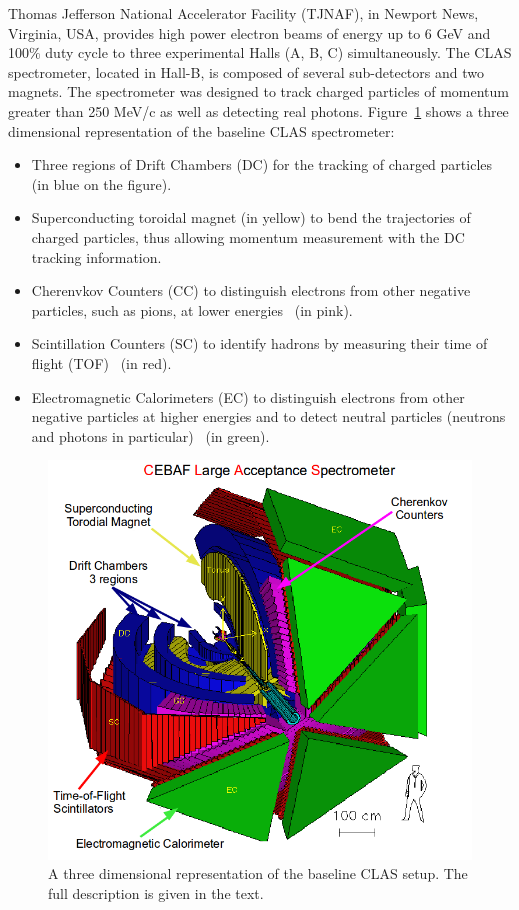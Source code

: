 \documentclass[twocolumn,showpacs,superscriptaddress,groupedaddress]{revtex4}
\begin{document}
Thomas Jefferson National Accelerator Facility (TJNAF), in Newport News, Virginia,
USA, provides high power electron beams of energy up to 6 GeV and 100$\%$ duty cycle
to three experimental Halls (A, B, C) simultaneously. The CLAS spectrometer, located
in Hall-B, is composed of several sub-detectors and two magnets. The spectrometer
was designed to track charged particles of momentum greater than 250 MeV/c as well 
as detecting real photons. Figure~\ref{fig:CLAS} shows a three dimensional 
representation of the baseline CLAS spectrometer:
\begin{itemize}
 \item Three regions of Drift Chambers (DC) for the tracking of charged 
    particles~\cite{DCref} (in blue on the figure).
 \item Superconducting toroidal magnet (in yellow) to bend the trajectories 
    of charged particles, thus allowing momentum measurement with the DC tracking information.
 \item Cherenvkov Counters (CC) to distinguish electrons from other negative 
    particles, such as pions, at lower energies~\cite{CCref} (in pink).
 \item Scintillation Counters (SC) to identify hadrons by measuring their 
    time of flight (TOF)~\cite{TOFref} (in red).
 \item Electromagnetic Calorimeters (EC) to distinguish electrons from other negative 
    particles at higher energies and to detect neutral particles (neutrons and 
    photons in particular)~\cite{ECref} (in green).
\end{itemize}

\begin{figure}[tbp]
\centering \includegraphics[scale=0.3]{fig/test_clas.png}
\caption{A three dimensional representation of the baseline CLAS setup. The
   full description is given in the text.} \label{fig:CLAS}
\end{figure}
\end{document}

